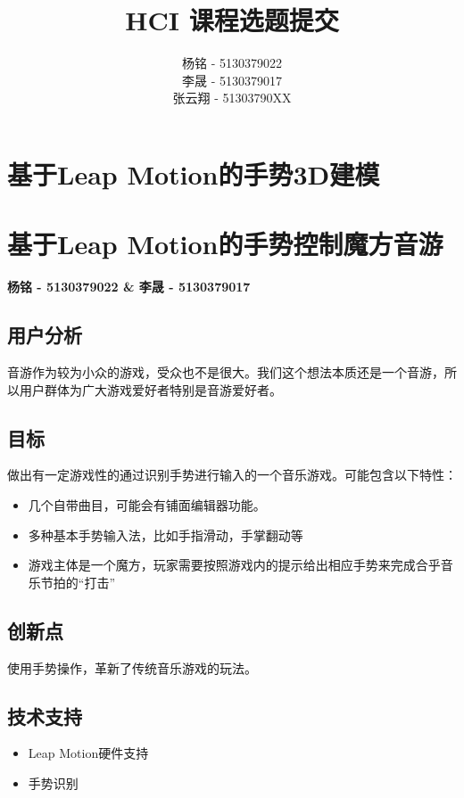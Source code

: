 \documentclass{article} \usepackage{CJK}
\author{杨铭 - 5130379022\\
        李晟 - 5130379017\\
        张云翔 - 51303790XX}
\title{HCI 课程选题提交}
\begin{document}
\maketitle
\section{基于Leap Motion的手势3D建模}
\newpage
\section{基于Leap Motion的手势控制魔方音游}
\textbf{杨铭 - 5130379022 \& 李晟 - 5130379017}
\subsection{用户分析}
音游作为较为小众的游戏，受众也不是很大。我们这个想法本质还是一个音游，所以用户群体为广大游戏爱好者特别是音游爱好者。
\subsection{目标}
做出有一定游戏性的通过识别手势进行输入的一个音乐游戏。可能包含以下特性：
\begin{itemize}
  \item 几个自带曲目，可能会有铺面编辑器功能。
  \item 多种基本手势输入法，比如手指滑动，手掌翻动等
  \item 游戏主体是一个魔方，玩家需要按照游戏内的提示给出相应手势来完成合乎音乐节拍的“打击”
\end{itemize}
\subsection{创新点}
使用手势操作，革新了传统音乐游戏的玩法。
\subsection{技术支持}
\begin{itemize}
  \item Leap Motion硬件支持
  \item 手势识别
\end{itemize}
\newpage
\section{}
\end{document}
